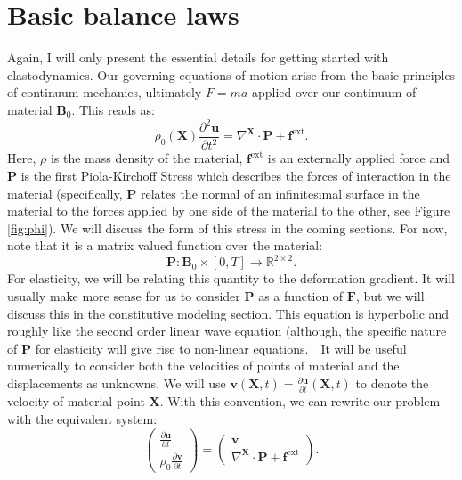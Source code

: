 \section*{Basic balance laws}
Again, I will only present the essential details for getting started with elastodynamics. Our governing equations of motion arise from the basic principles of continuum mechanics, ultimately $F=ma$ applied over our continuum of material $\mathbf{B}_0$. This reads as:
$$
\rho_0(\mathbf{X})\frac{\partial^2\mathbf{u}}{\partial{t}^2}=\nabla^\mathbf{X}\cdot\mathbf{P}+\mathbf{f}^{\textrm{ext}}.
$$
Here, $\rho$ is the mass density of the material, $\mathbf{f}^\textrm{ext}$ is an externally applied force and $\mathbf{P}$ is the first Piola-Kirchoff Stress which describes the forces of interaction in the material (specifically, $\mathbf{P}$ relates the normal of an infinitesimal surface in the material to the forces applied by one side of the material to the other, see Figure \ref{fig:phi}). We will discuss the form of this stress in the coming sections. For now, note that it is a matrix valued function over the material:
$$
\mathbf{P}:\mathbf{B}_0\times[0,T]\rightarrow\mathbb{R}^{2\times2}.
$$
For elasticity, we will be relating this quantity to the deformation gradient. It will usually make more sense for us to consider $\mathbf{P}$ as a function of $\mathbf{F}$, but we will discuss this in the constitutive modeling section. This equation is hyperbolic and roughly like the second order linear wave equation (although, the specific nature of $\mathbf{P}$ for elasticity will give rise to non-linear equations.\
\
It will be useful numerically to consider both the velocities of points of material and the displacements as unknowns. We will use $\mathbf{v}(\mathbf{X},t)=\frac{\partial\mathbf{u}}{\partial{t}}(\mathbf{X},t)$ to denote the velocity of material point $\mathbf{X}$. With this convention, we can rewrite our problem with the equivalent system:
$$
\left(\begin{array}{c}
\frac{\partial\mathbf{u}}{\partial{t}} \\
\rho_0\frac{\partial\mathbf{v}}{\partial{t}} \end{array}\right)=\left(\begin{array}{c}
\mathbf{v} \\
\nabla^\mathbf{X}\cdot\mathbf{P}+\mathbf{f}^{\textrm{ext}} \end{array}\right).
$$

